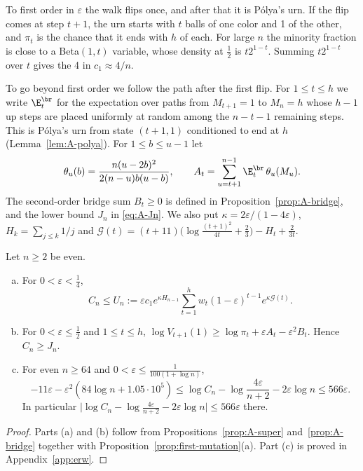 To first order in $\varepsilon$ the walk flips once, and after that it is
P\'olya's urn. If the flip comes at step $t+1$, the urn starts with $t$
balls of one color and 1 of the other, and $\pi_t$ is the chance that it
ends with $h$ of each. For large $n$ the minority fraction is close to a
Beta$(1,t)$ variable, whose density at $\frac12$ is $t2^{1-t}$. Summing
$t2^{1-t}$ over $t$ gives the 4 in $c_1\approx4/n$.

To go beyond first order we follow the path after the first flip. For
$1\le t\le h$ we write $\E^{\br}_t$ for the expectation over paths from
$M_{t+1}=1$ to $M_n=h$ whose $h-1$ up steps are placed uniformly at random
among the $n-t-1$ remaining steps. This is P\'olya's urn from state
$(t+1,1)$ conditioned to end at $h$ (Lemma~\ref{lem:A-polya}). For
$1\le b\le u-1$ let
\[
 \theta_u(b)=\frac{n(u-2b)^2}{2(n-u)b(u-b)},\qquad
 A_t=\sum_{u=t+1}^{n-1}\E^{\br}_t\,\theta_u(M_u).
\]
The second-order bridge sum $B_t\ge0$ is defined in
Proposition~\ref{prop:A-bridge}, and the lower bound $J_n$ in
\eqref{eq:A-Jn}. We also put $\kappa=2\varepsilon/(1-4\varepsilon)$,
$H_k=\sum_{j\le k}1/j$ and
$\mathcal G(t)=(t+11)\bigl(\log\frac{(t+1)^2}{4t}+\frac23\bigr)-H_t+\frac2{3t}$.

\begin{theorem}\label{thm:erw-bounds}
Let $n\ge2$ be even.
\begin{enumerate}[(a)]
\item For $0<\varepsilon<\frac14$,
\[
 C_n\le U_n:=\varepsilon c_1e^{\kappa H_{n-1}}\sum_{t=1}^hw_t(1-\varepsilon)^{t-1}e^{\kappa\mathcal G(t)}.
\]
\item For $0<\varepsilon\le\frac12$ and $1\le t\le h$,
$\log V_{t+1}(1)\ge\log\pi_t+\varepsilon A_t-\varepsilon^2B_t$. Hence
$C_n\ge J_n$.
\item For even $n\ge64$ and $0<\varepsilon\le\frac1{100(1+\log n)}$,
\[
 -11\varepsilon-\varepsilon^2(84\log n+1.05\cdot10^5)
 \le\log C_n-\log\frac{4\varepsilon}{n+2}-2\varepsilon\log n\le566\varepsilon .
\]
In particular
$\bigl|\log C_n-\log\frac{4\varepsilon}{n+2}-2\varepsilon\log n\bigr|\le566\varepsilon$
there.
\end{enumerate}
\end{theorem}

\begin{proof}
Parts (a) and (b) follow from Propositions~\ref{prop:A-super}
and~\ref{prop:A-bridge} together with
Proposition~\ref{prop:first-mutation}(a). Part (c) is proved in
Appendix~\ref{app:erw}.
\end{proof}

